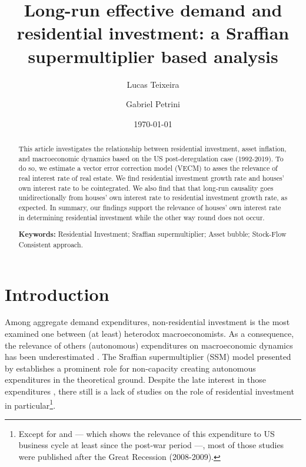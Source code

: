 \documentclass[11pt]{article}
\author{Lucas Teixeira \and Gabriel Petrini}
\date{\today}
\title{Long-run effective demand and residential investment: a Sraffian supermultiplier based analysis}
\begin{document}
\maketitle
\begin{abstract}
This article investigates the relationship between residential investment, asset inflation, and macroeconomic dynamics based on
the US post-deregulation case (1992-2019). To do so, we estimate a vector error correction model (VECM) to asses the relevance of
real interest rate of real estate. We find residential investment growth rate and houses’ own interest rate to be cointegrated. We
also find that that long-run causality goes unidirectionally from houses’ own interest rate to residential investment growth rate,
as expected. In summary, our findings support the relevance of houses’ own interest rate in determining residential investment
while the other way round does not occur.

\noindent \textbf{Keywords:} Residential Investment; Sraffian supermultiplier; Asset bubble;  Stock-Flow Consistent approach.
\end{abstract}


\section{Introduction}
\label{sec:orge193ee7}
\label{sec:Introduction}
Among aggregate demand expenditures, non-residential investment is the most examined  one between (at least) heterodox macroeconomists.
As a consequence, the relevance of others (autonomous) expenditures on macroeconomic dynamics has been underestimated \cite{brochier_macroeconomics_2017}.
The Sraffian supermultiplier (SSM) model presented by \textcite{serrano_long_1995} establishes a prominent role for non-capacity creating autonomous expenditures in the theoretical ground.
Despite the late interest in those expenditures \cites{freitas_pattern_2013}{girardi_long-run_2016}{girardi_autonomous_2018}{braga_investment_2018}, there still is a lack of studies on the role of residential investment in particular\footnote{Except for \textcite{green_follow_1997} and \textcite{leamer_housing_2007} --- which shows the relevance of this expenditure to US business cycle at least since the post-war period ---, most of those studies were published after the Great Recession (2008-2009).}. 
\end{document}
